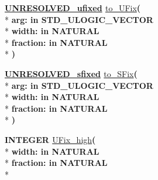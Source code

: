 \begin{DoxyCompactItemize}
\item 
{\bfseries {\bfseries {\bfseries \hyperlink{classfixed__pkg_ae78bc2b36d22f6abeac163955e8a587d}{U\+N\+R\+E\+S\+O\+L\+V\+E\+D\+\_\+ufixed}} \textcolor{vhdlchar}{ }}} \hyperlink{classfixed__pkg_a8958e5546182abd6114937a60e629a90}{to\+\_\+\+U\+Fix}{\bfseries  ( }\\*
{\bfseries \textcolor{vhdlchar}{arg\+: }\textcolor{stringliteral}{in }{\bfseries \textcolor{comment}{S\+T\+D\+\_\+\+U\+L\+O\+G\+I\+C\+\_\+\+V\+E\+C\+T\+O\+R}\textcolor{vhdlchar}{ }}}\\*
{\bfseries \textcolor{vhdlchar}{width\+: }\textcolor{stringliteral}{in }{\bfseries \textcolor{comment}{N\+A\+T\+U\+R\+A\+L}\textcolor{vhdlchar}{ }}}\\*
{\bfseries \textcolor{vhdlchar}{fraction\+: }\textcolor{stringliteral}{in }{\bfseries \textcolor{comment}{N\+A\+T\+U\+R\+A\+L}\textcolor{vhdlchar}{ }}}\\*
{\bfseries  )} 
\item 
{\bfseries {\bfseries {\bfseries \hyperlink{classfixed__pkg_aa723b28a027c3c0f9bca02d75e8df4d6}{U\+N\+R\+E\+S\+O\+L\+V\+E\+D\+\_\+sfixed}} \textcolor{vhdlchar}{ }}} \hyperlink{classfixed__pkg_a5206ba96e8fde8df1ad0cc58d7ea3a8b}{to\+\_\+\+S\+Fix}{\bfseries  ( }\\*
{\bfseries \textcolor{vhdlchar}{arg\+: }\textcolor{stringliteral}{in }{\bfseries \textcolor{comment}{S\+T\+D\+\_\+\+U\+L\+O\+G\+I\+C\+\_\+\+V\+E\+C\+T\+O\+R}\textcolor{vhdlchar}{ }}}\\*
{\bfseries \textcolor{vhdlchar}{width\+: }\textcolor{stringliteral}{in }{\bfseries \textcolor{comment}{N\+A\+T\+U\+R\+A\+L}\textcolor{vhdlchar}{ }}}\\*
{\bfseries \textcolor{vhdlchar}{fraction\+: }\textcolor{stringliteral}{in }{\bfseries \textcolor{comment}{N\+A\+T\+U\+R\+A\+L}\textcolor{vhdlchar}{ }}}\\*
{\bfseries  )} 
\item 
{\bfseries {\bfseries \textcolor{comment}{I\+N\+T\+E\+G\+E\+R}\textcolor{vhdlchar}{ }}} \hyperlink{classfixed__pkg_a7ddf1b7807e9ebf974a1827414de166d}{U\+Fix\+\_\+high}{\bfseries  ( }\\*
{\bfseries \textcolor{vhdlchar}{width\+: }\textcolor{stringliteral}{in }{\bfseries \textcolor{comment}{N\+A\+T\+U\+R\+A\+L}\textcolor{vhdlchar}{ }}}\\*
{\bfseries \textcolor{vhdlchar}{fraction\+: }\textcolor{stringliteral}{in }{\bfseries \textcolor{comment}{N\+A\+T\+U\+R\+A\+L}\textcolor{vhdlchar}{ }}}\\*

\end{DoxyCompactItemize}
